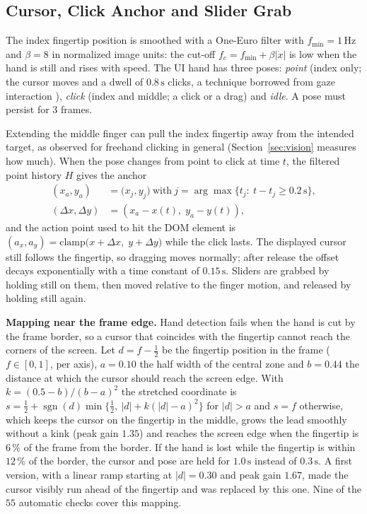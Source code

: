 \documentclass[5p,twocolumn]{elsarticle}
\begin{document}
\subsection{Cursor, Click Anchor and Slider Grab}
The index fingertip position is smoothed with a One-Euro filter \cite{casiez2012} with $f_{\min}=1\,\mathrm{Hz}$ and $\beta=8$ in normalized image units: the cut-off $f_c=f_{\min}+\beta|\dot{x}|$ is low when the hand is still and rises with speed. The UI hand has three poses: \emph{point} (index only; the cursor moves and a dwell of $0.8\,\mathrm{s}$ clicks, a technique borrowed from gaze interaction \cite{jacob1991}), \emph{click} (index and middle; a click or a drag) and \emph{idle}. A pose must persist for $3$ frames.

Extending the middle finger can pull the index fingertip away from the intended target, as observed for freehand clicking in general \cite{vogel2005} (Section~\ref{sec:vision} measures how much). When the pose changes from point to click at time $t$, the filtered point history $H$ gives the anchor
\begin{align}
(x_a,y_a)&=\bigl(x_j,y_j\bigr)\ \text{with}\ j=\arg\max\{t_j:\ t-t_j\ge 0.2\,\mathrm{s}\},\nonumber\\
(\Delta x,\Delta y)&=(x_a-x(t),\;y_a-y(t)),\label{eq:anchor}
\end{align}
and the action point used to hit the DOM element is $(a_x,a_y)=\mathrm{clamp}\bigl(x+\Delta x,\;y+\Delta y\bigr)$ while the click lasts. The displayed cursor still follows the fingertip, so dragging moves normally; after release the offset decays exponentially with a time constant of $0.15\,\mathrm{s}$. Sliders are grabbed by holding still on them, then moved relative to the finger motion, and released by holding still again.

\textbf{Mapping near the frame edge.}\label{sec:edge} Hand detection fails when the hand is cut by the frame border, so a cursor that coincides with the fingertip cannot reach the corners of the screen. Let $d=f-\tfrac12$ be the fingertip position in the frame ($f\in[0,1]$, per axis), $a=0.10$ the half width of the central zone and $b=0.44$ the distance at which the cursor should reach the screen edge. With $k=(0.5-b)/(b-a)^2$ the stretched coordinate is $s=\tfrac12+\operatorname{sgn}(d)\min\{\tfrac12,\ |d|+k(|d|-a)^2\}$ for $|d|>a$ and $s=f$ otherwise, which keeps the cursor on the fingertip in the middle, grows the lead smoothly without a kink (peak gain $1.35$) and reaches the screen edge when the fingertip is $6\,\%$ of the frame from the border. If the hand is lost while the fingertip is within $12\,\%$ of the border, the cursor and pose are held for $1.0\,\mathrm{s}$ instead of $0.3\,\mathrm{s}$. A first version, with a linear ramp starting at $|d|=0.30$ and peak gain $1.67$, made the cursor visibly run ahead of the fingertip and was replaced by this one. Nine of the $55$ automatic checks cover this mapping.
\end{document}
